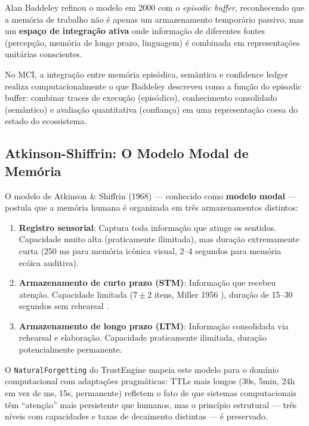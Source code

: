 Alan Baddeley refinou o modelo em 2000 \cite{Baddeley2000_EpisodicBuffer} com o \textit{episodic buffer}, reconhecendo que a memória de trabalho não é apenas um armazenamento temporário passivo, mas um \textbf{espaço de integração ativa} onde informação de diferentes fontes (percepção, memória de longo prazo, linguagem) é combinada em representações unitárias conscientes.

No MCI, a integração entre memória episódica, semântica e confidence ledger realiza computacionalmente o que Baddeley descreveu como a função do episodic buffer: combinar traces de execução (episódico), conhecimento consolidado (semântico) e avaliação quantitativa (confiança) em uma representação coesa do estado do ecossistema.

\subsection{Atkinson-Shiffrin: O Modelo Modal de Memória}

O modelo de Atkinson \& Shiffrin (1968) \cite{Atkinson1968_Memory} — conhecido como \textbf{modelo modal} — postula que a memória humana é organizada em três armazenamentos distintos:

\begin{enumerate}
    \item \textbf{Registro sensorial}: Captura toda informação que atinge os sentidos. Capacidade muito alta (praticamente ilimitada), mas duração extremamente curta (250 ms para memória icônica visual, 2--4 segundos para memória ecóica auditiva).
    
    \item \textbf{Armazenamento de curto prazo (STM)}: Informação que recebeu atenção. Capacidade limitada ($7 \pm 2$ itens, Miller 1956 \cite{Miller1956_Magical7}), duração de 15--30 segundos sem rehearsal \cite{Peterson1959_STM}.
    
    \item \textbf{Armazenamento de longo prazo (LTM)}: Informação consolidada via rehearsal e elaboração. Capacidade praticamente ilimitada, duração potencialmente permanente.
\end{enumerate}

O \texttt{NaturalForgetting} do TrustEngine mapeia este modelo para o domínio computacional com adaptações pragmáticas: TTLs mais longos (30s, 5min, 24h em vez de ms, 15s, permanente) refletem o fato de que sistemas computacionais têm ``atenção'' mais persistente que humanos, mas o princípio estrutural — três níveis com capacidades e taxas de decaimento distintas — é preservado.

